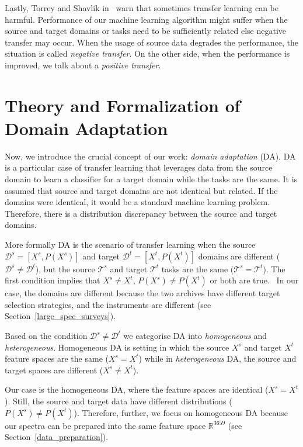 Lastly, Torrey and Shavlik in~\cite{torrey2010} warn
that sometimes transfer learning can be harmful.
Performance of our machine learning algorithm might suffer
when the source and target domains or tasks need to be sufficiently related
else negative transfer may occur.
When the usage of source data degrades the performance,
the situation is called \textit{negative transfer}.
On the other side, when the performance is improved,
we talk about a \textit{positive transfer}.

\section{Theory and Formalization of Domain Adaptation}

Now, we introduce the crucial concept of our work: \textit{domain adaptation} (DA).
DA is a particular case of transfer learning
that leverages data from the source domain to learn a classifier for a target domain while the tasks are the same.
It is assumed that source and target domains are not identical but related.
If the domains were identical, it would be a standard machine learning problem.
Therefore, there is a distribution discrepancy between the source and target domains.~\cite{csurka2017}

More formally DA is the scenario of transfer learning
when the source \(\mathcal{D}^s = [X^s, P(X^s)]\)
and target \(\mathcal{D}^t = [X^t, P(X^t)]\) domains
are different (\(\mathcal{D}^s \ne \mathcal{D}^t\)),
but the source \(\mathcal{T}^s\) and target \(\mathcal{T}^t\)
tasks are the same (\(\mathcal{T}^s = \mathcal{T}^t\)).
The first condition implies
that \(X^s \ne X^t\), \(P(X^s) \ne P(X^t)\) or both are true.~\cite{pan2010}
In our case, the domains are different
because the two archives have different target selection strategies,
and the instruments are different (see Section~\ref{large_spec_surveys}).

Based on the condition \(\mathcal{D}^s \ne \mathcal{D}^t\)
we categorise DA into \textit{homogeneous} and \textit{heterogeneous}.
Homogeneous DA is setting in which the source \(X^s\)
and target \(X^t\) feature spaces are the same (\(X^s = X^t\))
while in \textit{heterogeneous} DA, the source and target spaces are different
(\(X^s \ne X^t\)).~\cite{csurka2017}

Our case is the homogeneous DA,
where the feature spaces are identical (\(X^s = X^t\)).
Still, the source and target data have different distributions (\(P(X^s) \ne P(X^t)\)).
Therefore, further, we focus on homogeneous DA
because our spectra can be prepared into the same feature space \(\mathbb{R}^{3659}\)
(see Section~\ref{data_preparation}).

